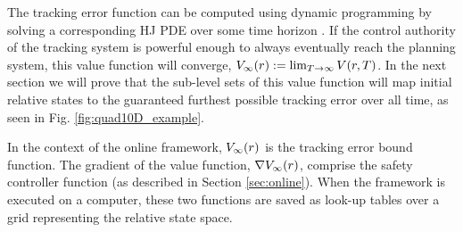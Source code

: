 The tracking error function can be computed using dynamic programming by solving a corresponding HJ PDE over some time horizon \cite{Mitchell05, Fisac15}. If the control authority of the tracking system is powerful enough to always eventually reach the planning system, this value function will converge, $V_\infty(r) := \lim_{T\rightarrow\infty} V(r, T)$. In the next section we will prove that the sub-level sets of this value function will map initial relative states to the guaranteed furthest possible tracking error over all time, as seen in Fig. \ref{fig:quad10D_example}.
 
In the context of the online framework, $V_\infty(r)$ is the tracking error bound function. The gradient of the value function, $\nabla V_\infty(r)$, comprise the safety controller function (as described in Section \ref{sec:online}). When the framework is executed on a computer, these two functions are saved as look-up tables over a grid representing the relative state space.
 
